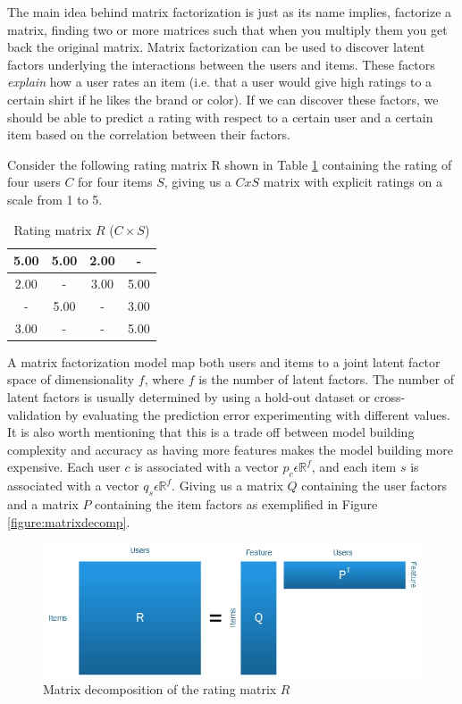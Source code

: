 The main idea behind matrix factorization is just as its name implies, factorize a matrix, finding two or more matrices such that when you multiply them you get back the original matrix. Matrix factorization can be used to discover latent factors underlying the interactions between the users and items. These factors \emph{explain} how a user rates an item (i.e. that a user would give high ratings to a certain shirt if he likes the brand or color). If we can discover these factors, we should be able to predict a rating with respect to a certain user and a certain item based on the correlation between their factors.

Consider the following rating matrix R shown in Table \ref{table:RatingMatrix} containing the rating of four users $C$ for four items $S$, giving us a $CxS$ matrix with explicit ratings on a scale from 1 to 5.

\begin{table}[!htbp]
\centering
\begin{tabular}{|c|c|c|c|}
\hline
5.00 	& 5.00	& 2.00 & - 	  \\ \hline
2.00 	& -		& 3.00 & 5.00 \\ \hline
 - 		& 5.00	& -    & 3.00 \\ \hline
3.00	& - 	& -	   & 5.00 \\ \hline
\end{tabular}
\label{table:RatingMatrix}
\caption{Rating matrix $R$ ($C \times S$)}
\end{table} 

A matrix factorization model map both users and items to a joint latent factor space of dimensionality $f$, where $f$ is the number of latent factors. The number of latent factors is usually determined by using a hold-out dataset or cross-validation by evaluating the prediction error experimenting with different values. It is also worth mentioning that this is a trade off between model building complexity and accuracy as having more features makes the model building more expensive. Each user $c$ is associated with a vector $p_{c} \epsilon \mathbb{R}^{f}$, and each item $s$ is associated with a vector $q_{s} \epsilon \mathbb{R}^{f}$. Giving us a matrix $Q$ containing the user factors and a matrix $P$ containing the item factors as exemplified in Figure \ref{figure:matrixdecomp}.

\begin{figure}[H]
    \includegraphics[width=5in]{image/matrixdecomp.jpg}
    \centering
    \caption[Matrix decomposition of the rating matrix $R$]{Matrix decomposition of the rating matrix $R$}
    \label{figure:ratingmatrix}
\end{figure}

